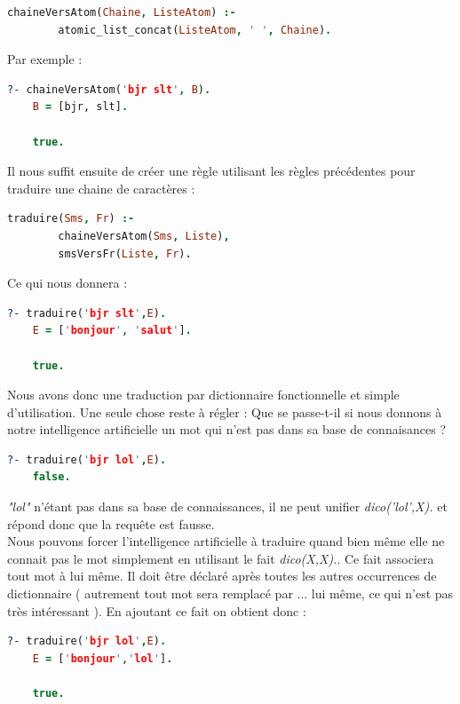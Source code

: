 \documentclass[11pt]{report}
\begin{document}
	\begin{lstlisting}[language=Prolog]
	chaineVersAtom(Chaine, ListeAtom) :-
		atomic_list_concat(ListeAtom, ' ', Chaine).
	\end{lstlisting}
	
	Par exemple :
	
	\begin{lstlisting}[language=Prolog]
	?- chaineVersAtom('bjr slt', B).
	B = [bjr, slt].
	
	true.
	\end{lstlisting}
	
	Il nous suffit ensuite de créer une règle utilisant les règles précédentes pour traduire une chaine de caractères :
	
	\begin{lstlisting}[language=Prolog]
	traduire(Sms, Fr) :-
		chaineVersAtom(Sms, Liste),
		smsVersFr(Liste, Fr).
	\end{lstlisting}
	
	Ce qui nous donnera :
	
	\begin{lstlisting}[language=Prolog]
	?- traduire('bjr slt',E).
	E = ['bonjour', 'salut'].
	
	true.
	\end{lstlisting}
	
	Nous avons donc une traduction par dictionnaire fonctionnelle et simple d'utilisation. Une seule chose reste à régler : Que se passe-t-il si nous donnons à notre intelligence artificielle un mot qui n'est pas dans sa base de connaisances ?
	
	\begin{lstlisting}[language=Prolog]
	?- traduire('bjr lol',E).
	false.
	\end{lstlisting}
	
	{\em "lol"} n'étant pas dans sa base de connaissances, il ne peut unifier {\em dico('lol',X).} et répond donc que la requête est fausse.\\
	Nous pouvons forcer l'intelligence artificielle à traduire quand bien même elle ne connait pas le mot simplement en utilisant le fait {\em dico(X,X).}. Ce fait associera tout mot à lui même. Il doit être déclaré après toutes les autres occurrences de dictionnaire ( autrement tout mot sera remplacé par ... lui même, ce qui n'est pas très intéressant ). En ajoutant ce fait on obtient donc :
	
	\begin{lstlisting}[language=Prolog]
	?- traduire('bjr lol',E).
	E = ['bonjour','lol'].
	
	true.
	\end{lstlisting}
	
\end{document}
